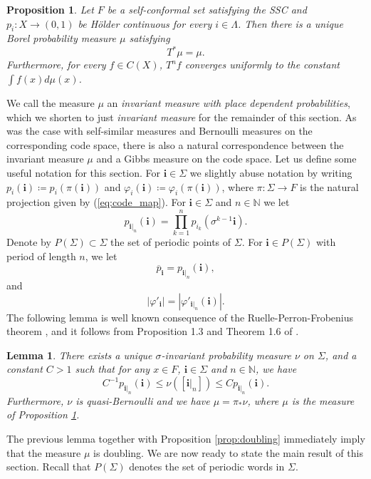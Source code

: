 \documentclass{PRM}
\newcommand{\field}[1]{\mathbb{#1}}
\newcommand{\N}{\field{N}}
\theoremstyle{plain}
\newtheorem{lemma}[thm]{Lemma}
\newtheorem{prop}[thm]{Proposition}
\theoremstyle{definition}
\theoremstyle{remark}
\begin{document}
\begin{prop}\label{prop:invmeas}
Let $F$ be a self-conformal set satisfying the SSC and $p_i\colon X\to (0,1)$ be Hölder continuous for every $i\in\Lambda$. Then there is a unique Borel probability measure $\mu$ satisfying
\begin{equation*}
    T^*\mu=\mu.
\end{equation*}
Furthermore, for every $f\in C(X)$, $T^nf$ converges uniformly to the constant $\int f(x)d \mu(x)$.
\end{prop}
We call the measure $\mu$ an \emph{invariant measure with place dependent probabilities}, which we shorten to just \emph{invariant measure} for the remainder of this section. As was the case with self-similar measures and Bernoulli measures on the corresponding code space, there is also a natural correspondence between the invariant measure $\mu$ and a Gibbs measure on the code space. Let us define some useful notation for this section. For $\mathbf{i}\in\Sigma$ we slightly abuse notation by writing $p_i(\mathbf{i})\coloneqq p_i(\pi(\mathbf{i}))$ and $\varphi_i(\mathbf{i})\coloneqq\varphi_i(\pi(\mathbf{i}))$, where $\pi\colon \Sigma\to F$ is the natural projection given by (\ref{eq:code_map}). For $\mathbf{i}\in\Sigma$ and $n\in\N$ we let
\begin{equation*}
    p_{\mathbf{i}|_n}(\mathbf{i}) =\prod_{k=1}^{n}p_{i_k}(\sigma^{k-1}\mathbf{i}).
\end{equation*}
Denote by $P(\Sigma)\subset\Sigma$ the set of periodic points of $\Sigma$. For $\mathbf{i}\in P(\Sigma)$ with period of length $n$, we let
\begin{equation*}
    \overline{p}_{\mathbf{i}}=p_{\mathbf{i}|_{n}}(\mathbf{i}),
\end{equation*}
and
\begin{equation*}
    |\varphi'_{\mathbf{i}}|=|\varphi'_{\mathbf{i}|_{n}}(\mathbf{i})|.
\end{equation*}
The following lemma is well known consequence of the Ruelle-Perron-Frobenius theorem \cite{Bow}, and it follows from Proposition 1.3 and Theorem 1.6 of \cite{Fan}.

\begin{lemma}\label{lemma:gibbs}
There exists a unique $\sigma$-invariant probability measure $\nu$ on $\Sigma$, and a constant $C>1$ such that for any $x\in F$, $\mathbf{i}\in\Sigma$ and $n\in\N$, we have
\begin{equation*}
    C^{-1}p_{\mathbf{i}|_n}(\mathbf{i})\leq \nu([\mathbf{i}|_n])\leq Cp_{\mathbf{i}|_n}(\mathbf{i}).
\end{equation*}
Furthermore, $\nu$ is quasi-Bernoulli and we have $\mu=\pi_*\nu$, where $\mu$ is the measure of Proposition \ref{prop:invmeas}. 
\end{lemma}
The previous lemma together with Proposition \ref{prop:doubling} immediately imply that the measure $\mu$ is doubling. We are now ready to state the main result of this section. Recall that $P(\Sigma)$ denotes the set of periodic words in $\Sigma$.
\end{document}
